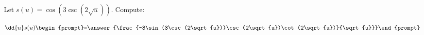 \documentclass{ximera}
\author{Bart Snapp\and Nela Lakos \and Bobby Ramsey}
\begin{document}
\begin{exercise}
Let $s(u) = \cos \left(3 \csc \left(2  \sqrt{u}\right)\right)$. Compute:

\[
\dd{u}s(u)
\begin{prompt}=\answer{\frac{-3\sin(3\csc(2\sqrt{u}))\csc(2\sqrt{u})\cot(2\sqrt{u})}{\sqrt{u}}}\end{prompt}
\]
\end{exercise}
\end{document}
